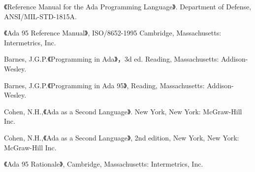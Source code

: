 %
%
%

\cleardoublepage
{}
\begin{thebibliography}{widest-label}\label{bib}

 《Reference Manual for the Ada Programming
Language》. Department of Defense, ANSI/MIL-STD-1815A.

 《Ada 95 Reference Manual》,
ISO/8652-1995 Cambridge, Massachusetts: Intermetrics, Inc.

 Barnes, J.G.P.《Programming in Ada》，3d ed.
Reading, Massachusetts: Addison-Wesley.

 Barnes, J.G.P.《Programming in Ada 95》,
Reading, Massachusetts: Addison-Wesley.

 Cohen, N.H.,《Ada as a Second Language》.
 New York, New York: McGraw-Hill Inc.

 Cohen, N.H.,《Ada as a Second Language》, 2nd edition, New York, New York: McGraw-Hill Inc.

 《Ada 95 Rationale》, Cambridge,
Massachusetts: Intermetrics, Inc. 

\end{thebibliography}
